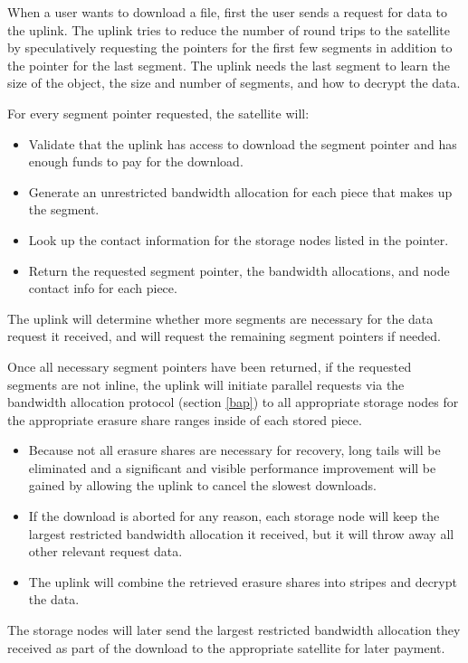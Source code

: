 \documentclass[11pt,fleqn,openany]{book}
\begin{document}
When a user wants to download a file, first the user sends a request for
data to the uplink.
  The uplink tries to reduce the number of round trips to the satellite
  by speculatively requesting the pointers for the first few segments in
  addition to the pointer for the last segment. The uplink needs the last
  segment to learn the size of the object, the size and number of segments,
  and how to decrypt the data.

For every segment pointer requested, the satellite will:
  \begin{itemize}
  \item Validate that the uplink has access to download the segment pointer
    and has enough funds to pay for the download.
  \item Generate an unrestricted bandwidth allocation for each piece that
    makes up the segment.
  \item Look up the contact information for the storage nodes listed in the
  pointer.
  \item Return the requested segment pointer, the bandwidth allocations, and
    node contact info for each piece.
  \end{itemize}

The uplink will determine whether more segments are necessary for the
  data request it received, and will request the remaining segment pointers if needed.

Once all necessary segment pointers have been returned, if the requested
  segments are not inline, the uplink will initiate parallel requests
  via the bandwidth allocation protocol (section \ref{bap}) to all appropriate storage
  nodes for the appropriate erasure share ranges inside of each stored piece.

\begin{itemize}
\item Because not all erasure shares are necessary for recovery, long tails
  will be eliminated and a significant and visible performance improvement will
  be gained by allowing the uplink to cancel the slowest downloads.
\item If the download is aborted for any reason, each storage node will keep the
  largest restricted bandwidth allocation it received, but it will throw away all
  other relevant request data.
\item The uplink will combine the retrieved erasure shares into stripes and
  decrypt the data.
\end{itemize}

The storage nodes will later send the largest restricted
  bandwidth allocation they received as part of the download to the appropriate
  satellite for later payment.
\end{document}
